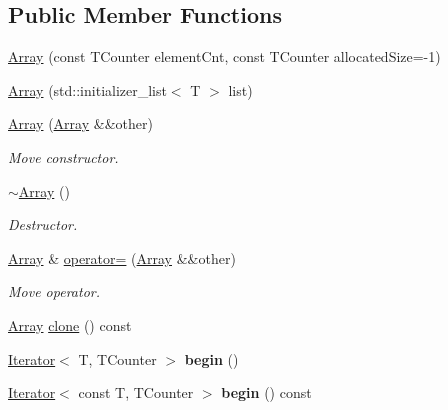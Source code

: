 \subsection*{Public Member Functions}
\begin{DoxyCompactItemize}
\item 
\hyperlink{classArray_a53a67b010c774165bbf8b64e1d4ee0e2}{Array} (const T\+Counter element\+Cnt, const T\+Counter allocated\+Size=-\/1)
\item 
\hyperlink{classArray_a4f87480b3f5553c15c70ddad372602fd}{Array} (std\+::initializer\+\_\+list$<$ T $>$ list)
\item 
\hypertarget{classArray_adbb5bab1e50f7b4728052f2a98eff126}{}\label{classArray_adbb5bab1e50f7b4728052f2a98eff126} 
\hyperlink{classArray_adbb5bab1e50f7b4728052f2a98eff126}{Array} (\hyperlink{classArray}{Array} \&\&other)
\begin{DoxyCompactList}\small\item\em Move constructor. \end{DoxyCompactList}\item 
\hypertarget{classArray_a675694cfa6441f7c138df7a9f20979a3}{}\label{classArray_a675694cfa6441f7c138df7a9f20979a3} 
\hyperlink{classArray_a675694cfa6441f7c138df7a9f20979a3}{$\sim$\+Array} ()
\begin{DoxyCompactList}\small\item\em Destructor. \end{DoxyCompactList}\item 
\hypertarget{classArray_a441d346a10b575c0a5989df056d9a96f}{}\label{classArray_a441d346a10b575c0a5989df056d9a96f} 
\hyperlink{classArray}{Array} \& \hyperlink{classArray_a441d346a10b575c0a5989df056d9a96f}{operator=} (\hyperlink{classArray}{Array} \&\&other)
\begin{DoxyCompactList}\small\item\em Move operator. \end{DoxyCompactList}\item 
\hyperlink{classArray}{Array} \hyperlink{classArray_a7cb2b9b74ad6856612d0bfcdbb0be366}{clone} () const
\item 
\hypertarget{classArray_a54fb6bf131beb33ac622f86ea69b8252}{}\label{classArray_a54fb6bf131beb33ac622f86ea69b8252} 
\hyperlink{classIterator}{Iterator}$<$ T, T\+Counter $>$ {\bfseries begin} ()
\item 
\hypertarget{classArray_a1298de4f3c86cc976c4a8e96bd9f5526}{}\label{classArray_a1298de4f3c86cc976c4a8e96bd9f5526} 
\hyperlink{classIterator}{Iterator}$<$ const T, T\+Counter $>$ {\bfseries begin} () const

\end{DoxyCompactItemize}
